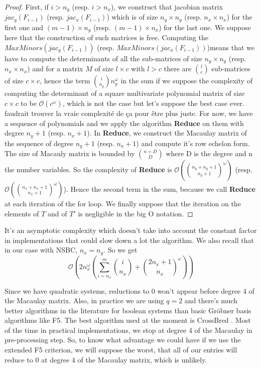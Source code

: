 \documentclass[english]{article}
\begin{document}
		 \begin{proof}
		 	First, if $i > n_y$ (resp. $i > n_x$), we construct that jacobian matrix $jac_y(F_{i-1})$ (resp. $jac_x(F_{i-1})$) which is of size $n_y \times n_y$ (resp. $n_x \times n_x$) for the first one and $(m-1) \times n_y$ (resp. $(m-1) \times n_x$) for the last one. We suppose here that the construction of such matrices is free. Computing the $MaxMinors(jac_y(F_{i-1}))$ (resp. $MaxMinors(jac_x(F_{i-1}))$)means that we have to compute the determinants of all the sub-matrices of size $n_y \times n_y$ (resp. $n_x \times n_x$) and for a matrix $M$ of size $l \times c$ with $l > c$ there are $\binom{l}{c}$ sub-matrices of size $c \times c$, hence the term $\binom{i}{n_y}n_y^{\omega}$ in the sum if we suppose the complexity of computing the determinant of a square multivariate polynomial matrix of size $c \times c$ to be $\mathcal{O}(c^\omega)$, which is not the case but let's suppose the best case ever. faudrait trouver la vraie complexité de ça pour être plus juste.
		 	For now, we have a sequence of polynomials and we apply the algorithm \textbf{Reduce} on them with degree $n_y + 1$ (resp. $n_x + 1$).
		 	In \textbf{Reduce}, we construct the Macaulay matrix of the sequence of degree $n_y + 1$ (resp. $n_x + 1$) and compute it's row echelon form.
		 	The size of Macauly matrix is bounded by $\binom{n + D}{D}$ where D is the degree and n the number variables. So the complexity of \textbf{Reduce} is $\mathcal{O}\left(\binom{n_y + n_y + 1}{n_y + 1}^\omega \right)$ (resp. $\mathcal{O}\left(\binom{n_x + n_x + 1}{n_x + 1}^\omega \right)$). Hence the second term in the sum, because we call \textbf{Reduce} at each iteration of the for loop. We finally suppose that the iteration on the elements of $T$ and of $T'$ is negligible in the big O notation.
		 \end{proof}
		 
		 It's an asymptotic complexity which doesn't take into account the constant factor in implementations that could slow down a lot the algorithm.
		 We also recall that in our case with NSBC, $n_x = n_y$. So we get
		 $$
		 \mathcal{O}\left(2n_x^{\omega}\left(\sum_{i = n_x}^{m} \binom{i}{n_x} + \binom{2n_x + 1}{n_x}^\omega\right)\right)
		 $$
		 
		 Since we have quadratic systems, reductions to 0 won't appear before degree 4 of the Macaulay matrix. Also, in practice we are using $q=2$ and there's much better algorithms in the literature for boolean systems than basic Gröbner basis algorithms like F5. The best algorithm used at the moment is CrossBred \cite{JV17}. Most of the time in practical implementations, we stop at degree 4 of the Macaulay in pre-processing step. So, to know what advantage we could have if we use the extended F5 criterion, we will suppose the worst, that all of our entries will reduce to 0 at degree 4 of the Macaulay matrix, which is unlikely.
		 
\end{document}
